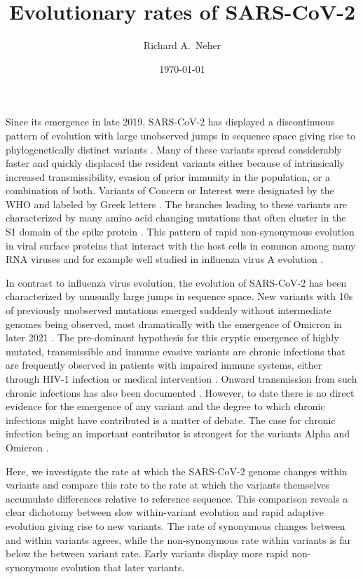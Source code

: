 \documentclass[aps,rmp, twocolumn]{revtex4}
\begin{document}
\title{Evolutionary rates of SARS-CoV-2}
\author{Richard A.~Neher}
\date{\today}
\maketitle

Since its emergence in late 2019, SARS-CoV-2 has displayed a discontinuous pattern of evolution with large unobserved jumps in sequence space giving rise to phylogenetically distinct variants \citep{hodcroft_spread_2021,volz_assessing_2021,tegally_detection_2021,faria_genomics_2021,naveca_covid-19_2021,viana_rapid_2022}.
Many of these variants spread considerably faster and quickly displaced the resident variants either because of intrinsically increased transmissibility, evasion of prior immunity in the population, or a combination of both.
Variants of Concern or Interest were designated by the WHO and labeled by Greek letters \citep{konings_sars-cov-2_2021}.
The branches leading to these variants are characterized by many amino acid changing mutations that often cluster in the S1 domain of the spike protein \citep{kistler_rapid_2022}.
This pattern of rapid non-synonymous evolution in viral surface proteins that interact with the host cells in common among many RNA viruses and for example well studied in influenza virus A evolution \citep{bhatt_genomic_2011,strelkowa_clonal_2012}.

In contrast to influenza virus evolution, the evolution of SARS-CoV-2 has been characterized by unusually large jumps in sequence space.
New variants with 10s of previously unobserved mutations emerged suddenly without intermediate genomes being observed, most dramatically with the emergence of Omicron in later 2021 \citep{viana_rapid_2022}.
The pre-dominant hypothesis for this cryptic emergence of highly mutated, transmissible and immune evasive variants are chronic infections that are frequently observed in patients with impaired immune systems, either through HIV-1 infection \citep{cele_sars-cov-2_2022} or medical intervention \citep{choi_persistence_2020,kemp_sars-cov-2_2021}.
Onward transmission from such chronic infections has also been documented \citep{gonzalez-reiche_intrahost_2022}.
However, to date there is no direct evidence for the emergence of any variant and the degree to which chronic infections might have contributed is a matter of debate.
The case for chronic infection being an important contributor is strongest for the variants Alpha and Omicron
\citep{hill_origins_2022}.

Here, we investigate the rate at which the SARS-CoV-2 genome changes within variants and compare this rate to the rate at which the variants themselves accumulate differences relative to reference sequence.
This comparison reveals a clear dichotomy between slow within-variant evolution and rapid adaptive evolution giving rise to new variants.
The rate of synonymous changes between and within variants agrees, while the non-synonymous rate within variants is far below the between variant rate.
Early variants display more rapid non-synonymous evolution that later variants.
\end{document}
